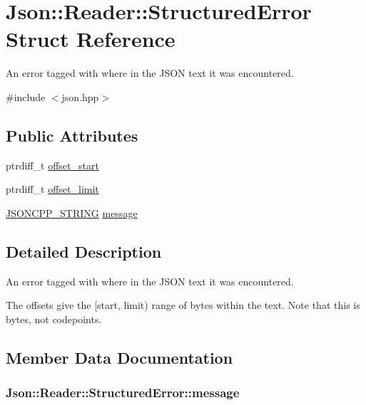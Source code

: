 \hypertarget{structJson_1_1Reader_1_1StructuredError}{}\section{Json\+:\+:Reader\+:\+:Structured\+Error Struct Reference}
\label{structJson_1_1Reader_1_1StructuredError}


An error tagged with where in the J\+S\+ON text it was encountered.  




{\ttfamily \#include $<$json.\+hpp$>$}

\subsection*{Public Attributes}
\begin{DoxyCompactItemize}
\item 
ptrdiff\+\_\+t \hyperlink{structJson_1_1Reader_1_1StructuredError_ac98af0da2d704be4b64a9572a682423b}{offset\+\_\+start}
\item 
ptrdiff\+\_\+t \hyperlink{structJson_1_1Reader_1_1StructuredError_ad76ac01aeb0ada7e882c2df5daa54c6e}{offset\+\_\+limit}
\item 
\hyperlink{json_8hpp_a1e723f95759de062585bc4a8fd3fa4be}{J\+S\+O\+N\+C\+P\+P\+\_\+\+S\+T\+R\+I\+NG} \hyperlink{structJson_1_1Reader_1_1StructuredError_a2d2dc387aefe406a71de3daa263a38f4}{message}
\end{DoxyCompactItemize}


\subsection{Detailed Description}
An error tagged with where in the J\+S\+ON text it was encountered. 

The offsets give the \mbox{[}start, limit) range of bytes within the text. Note that this is bytes, not codepoints. 

\subsection{Member Data Documentation}
\subsubsection[{\texorpdfstring{message}{message}}]{ Json\+::\+Reader\+::\+Structured\+Error\+::message}\hypertarget{structJson_1_1Reader_1_1StructuredError_a2d2dc387aefe406a71de3daa263a38f4}{}\label{structJson_1_1Reader_1_1StructuredError_a2d2dc387aefe406a71de3daa263a38f4}
